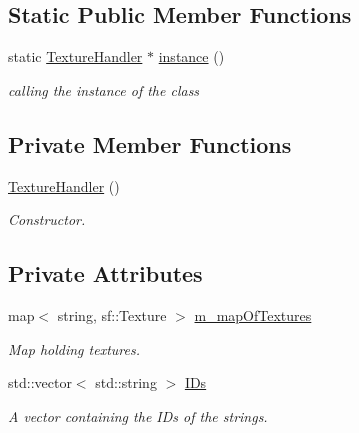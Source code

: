 \subsection*{Static Public Member Functions}
\begin{DoxyCompactItemize}
\item 
\mbox{\label{class_texture_handler_a4f7833f068be40b04495c529bdbb8eb7}} 
static \mbox{\hyperlink{class_texture_handler}{Texture\+Handler}} $\ast$ \mbox{\hyperlink{class_texture_handler_a4f7833f068be40b04495c529bdbb8eb7}{instance}} ()
\begin{DoxyCompactList}\small\item\em calling the instance of the class \end{DoxyCompactList}\end{DoxyCompactItemize}
\subsection*{Private Member Functions}
\begin{DoxyCompactItemize}
\item 
\mbox{\label{class_texture_handler_a9056de3d9a44b2e696c8e8b39462dd46}} 
\mbox{\hyperlink{class_texture_handler_a9056de3d9a44b2e696c8e8b39462dd46}{Texture\+Handler}} ()
\begin{DoxyCompactList}\small\item\em Constructor. \end{DoxyCompactList}\end{DoxyCompactItemize}
\subsection*{Private Attributes}
\begin{DoxyCompactItemize}
\item 
\mbox{\label{class_texture_handler_a65e3f9aa7333e9fd82259516f9c48c68}} 
map$<$ string, sf\+::\+Texture $>$ \mbox{\hyperlink{class_texture_handler_a65e3f9aa7333e9fd82259516f9c48c68}{m\+\_\+map\+Of\+Textures}}
\begin{DoxyCompactList}\small\item\em Map holding textures. \end{DoxyCompactList}\item 
\mbox{\label{class_texture_handler_a5449a61c7307806056cdb7dbfc3b8889}} 
std\+::vector$<$ std\+::string $>$ \mbox{\hyperlink{class_texture_handler_a5449a61c7307806056cdb7dbfc3b8889}{I\+Ds}}
\begin{DoxyCompactList}\small\item\em A vector containing the ID\textquotesingle{}s of the strings. \end{DoxyCompactList}\end{DoxyCompactItemize}
